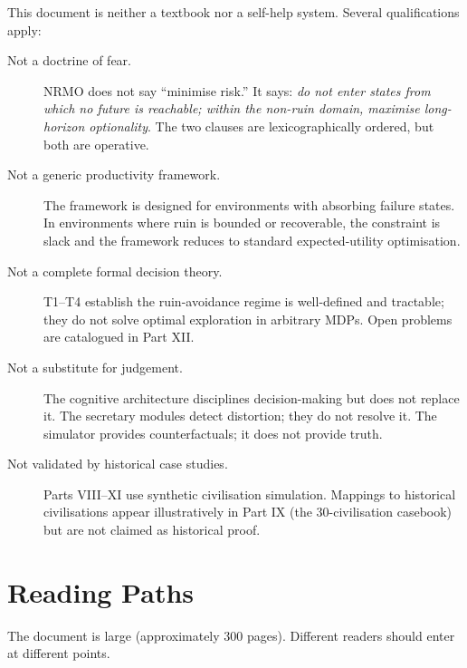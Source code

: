This document is neither a textbook nor a self-help system. Several
qualifications apply:

\begin{description}
\item[Not a doctrine of fear.] NRMO does not say ``minimise risk.'' It
says: \emph{do not enter states from which no future is reachable; within
the non-ruin domain, maximise long-horizon optionality}. The two
clauses are lexicographically ordered, but both are operative.
\item[Not a generic productivity framework.] The framework is designed
for environments with absorbing failure states. In environments where
ruin is bounded or recoverable, the constraint is slack and the
framework reduces to standard expected-utility optimisation.
\item[Not a complete formal decision theory.] T1--T4 establish the
ruin-avoidance regime is well-defined and tractable; they do not solve
optimal exploration in arbitrary MDPs. Open problems are catalogued in
Part XII.
\item[Not a substitute for judgement.] The cognitive architecture
disciplines decision-making but does not replace it. The secretary
modules detect distortion; they do not resolve it. The simulator
provides counterfactuals; it does not provide truth.
\item[Not validated by historical case studies.] Parts VIII--XI use
synthetic civilisation simulation. Mappings to historical civilisations
appear illustratively in Part IX (the 30-civilisation casebook) but are
not claimed as historical proof.
\end{description}

\section*{Reading Paths}

\noindent
The document is large (approximately 300 pages). Different readers
should enter at different points.

